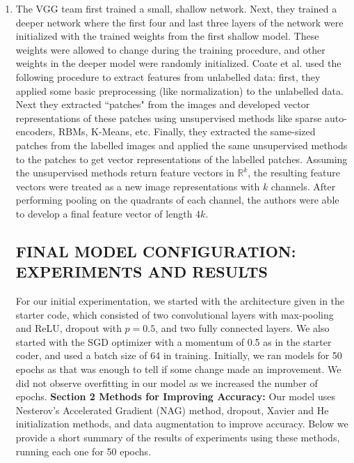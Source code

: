 \documentclass[a4paper]{article}
\begin{document}
\begin{enumerate}
{}
\item{ The VGG team first trained a small, shallow network. Next, they trained a deeper network where the first four and last three layers of the network were initialized with the trained weights from the first shallow model. These weights were allowed to change during the training procedure, and other weights in the deeper model were randomly initialized. 
\newline
\newline 
Coate et al. used the following procedure to extract features from unlabelled data: first, they applied some basic preprocessing (like normalization) to the unlabelled data. Next they extracted ``patches" from the images and developed vector representations of these patches using unsupervised methods like sparse auto-encoders, RBMs, K-Means, etc. Finally, they extracted the same-sized patches from the labelled images and applied the same unsupervised methods to the patches to get vector representations of the labelled patches. Assuming the unsupervised methods return feature vectors in $\mathbb{R}^k$, the resulting feature vectors were treated as a new image representations with $k$ channels. After performing pooling on the quadrants of each channel, the authors were able to develop a final feature vector of length $4k$. 

\subsection*{FINAL MODEL CONFIGURATION: EXPERIMENTS AND RESULTS}

For our initial experimentation, we started with the architecture given in the starter code, which consisted of two convolutional layers with max-pooling and ReLU, dropout with $p=0.5$, and two fully connected layers. We also started with the SGD optimizer with a momentum of 0.5 as in the starter coder, and used a batch size of 64 in training. Initially, we ran models for 50 epochs as that was enough to tell if some change made an improvement. We did not observe overfitting in our model as we increased the number of epochs. 
\newline
\newline
\textbf{Section 2 Methods for Improving Accuracy:}
\newline
\newline
Our model uses Nesterov's Accelerated Gradient (NAG) method, dropout, Xavier and He initialization methods, and data augmentation to improve accuracy. Below we provide a short summary of the results of experiments using these methods, running each one for 50 epochs. 

}
\end{enumerate}
\end{document}
